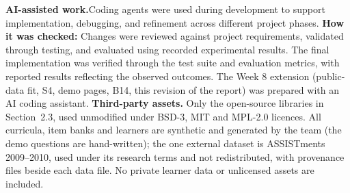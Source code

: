 \documentclass[english]{sintr}
\begin{document}
\textbf{AI-assisted work.}Coding agents were used during development to support implementation, debugging, and refinement across different project phases. \textbf{How it was checked:} Changes were reviewed against project requirements, validated through testing, and evaluated using recorded experimental results. The final implementation was verified through the test suite and evaluation metrics, with reported results reflecting the observed outcomes. The Week 8 extension (public-data fit, S4, demo pages, B14, this revision of the report) was prepared with an AI coding assistant.
\vspace{0.2em}\newline
\textbf{Third-party assets.} Only the open-source libraries in Section~2.3, used unmodified under BSD-3, MIT and MPL-2.0 licences. All curricula, item banks and learners are synthetic and generated by the team (the demo questions are hand-written); the one external dataset is ASSISTments 2009--2010, used under its research terms and not redistributed, with provenance files beside each data file. No private learner data or unlicensed assets are included.

\end{document}
